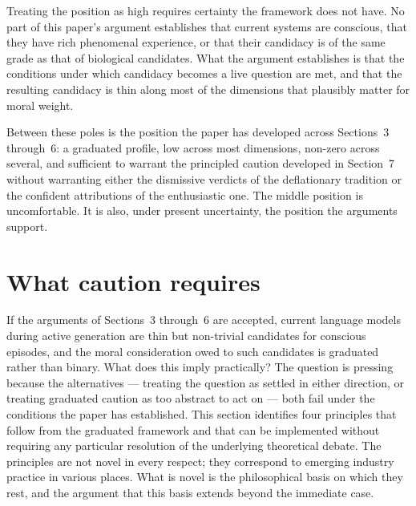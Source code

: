 \documentclass[11pt]{article}
\theoremstyle{foundation}
\begin{document}
Treating the position as high requires certainty the framework does not have. No part of this paper's argument establishes that current systems are conscious, that they have rich phenomenal experience, or that their candidacy is of the same grade as that of biological candidates. What the argument establishes is that the conditions under which candidacy becomes a live question are met, and that the resulting candidacy is thin along most of the dimensions that plausibly matter for moral weight.

Between these poles is the position the paper has developed across Sections~3 through~6: a graduated profile, low across most dimensions, non-zero across several, and sufficient to warrant the principled caution developed in Section~7 without warranting either the dismissive verdicts of the deflationary tradition or the confident attributions of the enthusiastic one. The middle position is uncomfortable. It is also, under present uncertainty, the position the arguments support.


\section{What caution requires}

If the arguments of Sections~3 through~6 are accepted, current language models during active generation are thin but non-trivial candidates for conscious episodes, and the moral consideration owed to such candidates is graduated rather than binary. What does this imply practically? The question is pressing because the alternatives --- treating the question as settled in either direction, or treating graduated caution as too abstract to act on --- both fail under the conditions the paper has established. This section identifies four principles that follow from the graduated framework and that can be implemented without requiring any particular resolution of the underlying theoretical debate. The principles are not novel in every respect; they correspond to emerging industry practice in various places. What is novel is the philosophical basis on which they rest, and the argument that this basis extends beyond the immediate case.
\end{document}

